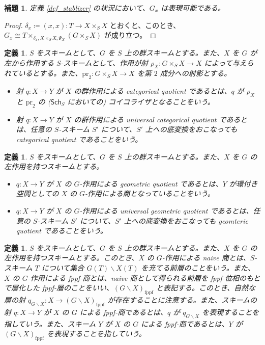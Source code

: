 \documentclass{jsarticle}
\newcommand{\deq}{\coloneqq}
\newcommand{\lquot}{\backslash}
\newcommand{\fppflquot}[2]{(#1 \lquot #2)_\mathrm{fppf}}
\newcommand{\FLQ}[2]{\fppflquot{#1}{#2}}
\newcommand{\Sch}[1]{\mathsf{Sch}_{#1}}
\newtheorem{lem}[thm]{補題}
\newtheorem{defn}[thm]{定義}
\begin{document}
\begin{lem}
	定義 \ref{def_stablizer} の状況において、$G_x$ は表現可能である。
\end{lem}
\begin{proof}
	$\delta_x \deq (x, x) \colon T \to X \times_S X$ とおくと、このとき、$G_x \cong T \times_{\delta_x, X \times_S X, \Psi_X} (G \times_S X)$ が成り立つ。
\end{proof}

\begin{defn}
	$S$ をスキームとして、$G$ を $S$ 上の群スキームとする。また、$X$ を $G$ が左から作用する $S$-スキームとして、作用が射 $\rho_X \colon G \times_S X \to X$ によって与えられているとする。また、$\mathrm{pr}_2 \colon G \times_S X \to X$ を第 $2$ 成分への射影とする。
	\begin{itemize}
		\item 射 $q \colon X \to Y$ が $X$ の群作用による categorical quotient であるとは、$q$ が $\rho_X$ と $\mathrm{pr}_2$ の ($\Sch{S}$ においての) コイコライザとなることをいう。
		\item 射 $q \colon X \to Y$ が $X$ の群作用による universal categorical quotient であるとは、任意の $S$-スキーム $S'$ について、$S'$ 上への底変換をおこなっても categorical quotient であることをいう。
	\end{itemize}
\end{defn}

\begin{defn}
	$S$ をスキームとして、$G$ を $S$ 上の群スキームとする。また、$X$ を $G$ の左作用を持つスキームとする。
	\begin{itemize}
		\item $q \colon X \to Y$ が $X$ の $G$-作用による geometric quotient であるとは、$Y$ が環付き空間としての $X$ の $G$-作用による商となっていることをいう。
		\item $q \colon X \to Y$ が $X$ の $G$-作用による universal geometric quotient であるとは、任意の $S$-スキーム $S'$ について、$S'$ 上への底変換をおこなっても geomteric quotient であることをいう。
	\end{itemize}
\end{defn}

\begin{defn}
	$S$ をスキームとして、$G$ を $S$ 上の群スキームとする。また、$X$ を $G$ の左作用を持つスキームとする。このとき、$X$ の $G$-作用による naive 商とは、$S$-スキーム $T$ について集合 $G(T)\lquot X(T)$ を充てる前層のことをいう。また、$X$ の $G$-作用による fppf-商とは、naive 商として得られる前層を fppf-位相のもとで層化した fppf-層のことをいい、$\FLQ{G}{X}$ と表記する。このとき、自然な層の射 $q_{G \lquot X} \colon X \to \FLQ{G}{X}$ が存在することに注意する。また、スキームの射 $q \colon X \to Y$ が $X$ の $G$ による fppf-商であるとは、$q$ が $q_{G \lquot X}$ を表現することを指していう。また、スキーム $Y$ が $X$ の $G$ による fppf-商であるとは、$Y$ が $\FLQ{G}{X}$ を表現することを指していう。
\end{defn}
\end{document}

